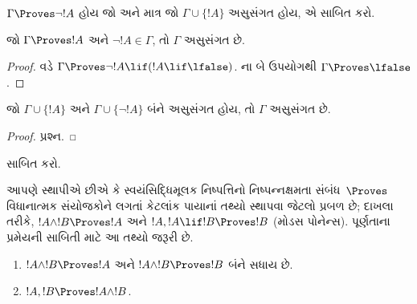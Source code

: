 \begin{prob}
$\Gamma \Proves \lnot !A$ હોય જો અને માત્ર જો $\Gamma \cup \{!A\}$
અસુસંગત હોય, એ સાબિત કરો.
\end{prob}

\begin{prop}
  જો $\Gamma \Proves !A$ અને $\lnot !A \in \Gamma$, તો $\Gamma$
  અસુસંગત છે.
\end{prop}

\begin{proof}
   વડે
  $\Gamma \Proves \lnot !A \lif (!A \lif \lfalse)$.
  ના બે ઉપયોગથી $\Gamma \Proves \lfalse$.
\end{proof}


\begin{prop}
  જો $\Gamma \cup \{!A\}$ અને $\Gamma \cup \{\lnot !A\}$ બંને
  અસુસંગત હોય, તો $\Gamma$ અસુસંગત છે.
\end{prop}

\begin{proof}
પ્રશ્ન.
\end{proof}

\begin{prob}
   સાબિત કરો.
\end{prob}


\endgroup


\begingroup
\makeatletter{}\makeatother


\label{guunit:OLP-0122}


\begin{explain}
  આપણે સ્થાપીએ છીએ કે સ્વયંસિદ્ધિમૂલક નિષ્પત્તિનો નિષ્પન્નક્ષમતા
  સંબંધ~$\Proves$ વિધાનાત્મક સંયોજકોને લગતાં કેટલાંક પાયાનાં તથ્યો
  સ્થાપવા જેટલો પ્રબળ છે; દાખલા તરીકે, $!A \land !B \Proves !A$ અને
  $!A, !A \lif !B \Proves !B$ (મોડસ પોનેન્સ). પૂર્ણતાના પ્રમેયની
  સાબિતી માટે આ તથ્યો જરૂરી છે.
\end{explain}

\begin{prop}
  \begin{enumerate}
  \item {} $!A \land !B \Proves !A$
    અને $!A \land !B \Proves !B$ બંને સધાય છે.
  \item {} $!A, !B \Proves !A \land !B$.
  \end{enumerate}
\end{prop}

